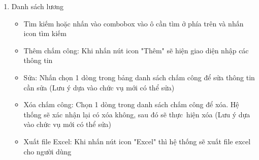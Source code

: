 \documentclass[a4paper,12pt]{report}
\begin{document}
\begin{itemize}
\begin{itemize}
\begin{enumerate}[label=B\arabic*:]
\begin{enumerate}[label=B3.\arabic*:]
\begin{itemize}
                                            \item Tìm kiếm nhân viên cần xem hoặc nhấn vào combobox vào ô cần tìm ở phía trên và nhấn icon tìm kiếm
                                            \item Thêm nhân viên: Khi nhấn nút icon "Thêm" sẽ hiện giao~diện nhập các thông tin nhân viên (mã nhân viên, họ tên, ngày sinh, giới tính, địa chỉ, chức vụ, mật khẩu, hình ảnh, trạng~thái, chi~nhánh sau đó nhấn nút "Lưu")
                                            \item Sửa nhân viên: Nhấn chọn 1 dòng trong bảng danh sách nhân~viên để sửa thông tin cần sửa
                                            \item Xóa nhân viên: Chọn 1 dòng trong danh sách nhân viên để xóa. Hệ thống sẽ xác nhận lại có xóa không, sau đó sẽ thực~hiện xóa
                                            \item Xem nhân viên: Chọn 1 dòng trong danh sách nhân viên sau đó hệ thống sẽ hiện đầy đủ thông tin nhân viên
                                            \item Xuất file Excel: Khi nhấn nút icon "Excel" thì hệ thống sẽ xuất file excel cho người dùng
                                            \item In file: Khi nhấn nút icon "In" thì hệ thống sẽ in file pdf cho người dùng
                                        \end{itemize}
                                  \item Danh sách lương 
                                        \begin{itemize}
                                            \item Tìm kiếm hoặc nhấn vào combobox vào ô cần tìm ở phía trên và nhấn icon tìm kiếm
                                            \item Thêm chấm công: Khi nhấn nút icon "Thêm" sẽ hiện giao diện nhập các thông tin
                                            \item Sửa: Nhấn chọn 1 dòng trong bảng danh sách chấm công để sửa thông tin cần sửa (Lưu ý dựa vào chức vụ mới có thể sửa)
                                            \item Xóa chấm công: Chọn 1 dòng trong danh sách chấm công để xóa. Hệ thống sẽ xác nhận lại có xóa không, sau đó sẽ thực~hiện xóa (Lưu ý dựa vào chức vụ mới có thể sửa)
                                            \item Xuất file Excel: Khi nhấn nút icon "Excel" thì hệ thống sẽ xuất file excel cho người dùng

\end{itemize}
\end{enumerate}
\end{enumerate}
\end{itemize}
\end{itemize}
\end{document}
